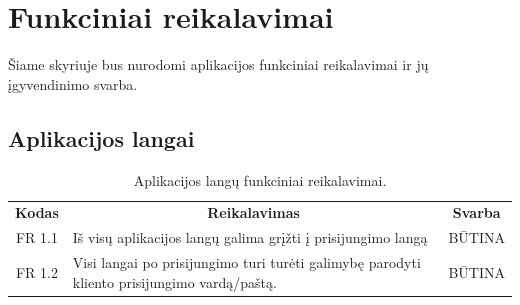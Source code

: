 \documentclass{VUMIFPSkursinis}
\begin{document}
\section{Funkciniai reikalavimai}

Šiame skyriuje bus nurodomi aplikacijos funkciniai reikalavimai ir jų įgyvendinimo svarba.

\subsection{Aplikacijos langai}

\begin{center}
	\begin{table}[H]
	\caption{Aplikacijos langų funkciniai reikalavimai.}
	\begin{tabular}{|p{2cm}|p{}|p{}|}
	\hline
	    \rowcolor{lightgray}
		\multicolumn{3}{|c|}{Aplikacijos langai}\\
		
	\hline
		\multicolumn{1}{|c|}{{\bfseries Kodas}}&
		\multicolumn{1}{|c|}{{\bfseries Reikalavimas}}&
		\multicolumn{1}{|c|}{{\bfseries Svarba}}\\

	\hline
		\multicolumn{1}{|c|}{FR 1.1} &
		Iš visų aplikacijos langų galima grįžti į prisijungimo langą &
		\multicolumn{1}{|c|}{BŪTINA}\\
	\hline
		\multicolumn{1}{|c|}{FR 1.2} &
		{Visi langai po prisijungimo turi turėti galimybę parodyti kliento \newline prisijungimo vardą/paštą.}&
		\multicolumn{1}{|c|}{BŪTINA}\\
	\hline
	

\end{tabular}
\end{table}
\end{center}
\end{document}
